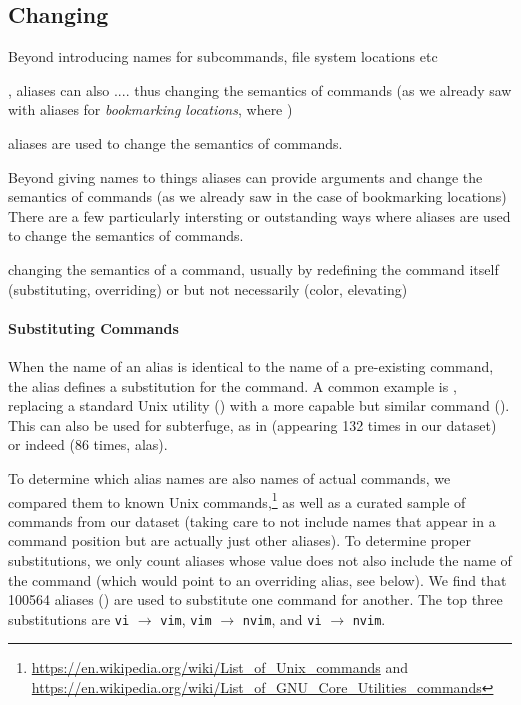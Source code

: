 \subsection{Changing}

Beyond introducing names for 
subcommands, file system locations etc

, aliases can also ....
thus changing the semantics of commands (as we already saw with aliases for \emph{bookmarking locations}, where )

aliases are used to change the semantics of commands.


Beyond giving names to things
aliases can provide arguments
and change the semantics of commands (as we already saw in the case of bookmarking locations)
There are a few particularly intersting or outstanding ways where aliases are used to change the semantics of commands.

\TODO changing the semantics of a command, usually by redefining the command itself (substituting, overriding) or but not necessarily (color, elevating)

\paragraph{\bf Substituting Commands}

When the name of an alias is identical to the name of a pre-existing command, the alias defines a substitution for the command.
A common example is , replacing a standard Unix utility () with a more capable but similar command ().
This can also be used for subterfuge, as in  (appearing 132 times in our dataset) or indeed  (86 times, alas).

To determine which alias names are also names of actual commands, we compared them to known Unix commands,\footnote{\url{https://en.wikipedia.org/wiki/List_of_Unix_commands} and \url{https://en.wikipedia.org/wiki/List_of_GNU_Core_Utilities_commands}} as well as a curated sample of commands from our dataset (taking care to not include names that appear in a command position but are actually just other aliases).
To determine proper substitutions, we only count aliases whose value does not also include the name of the command (which would point to an overriding alias, see below).
We find that \num{100564} aliases () are used to substitute one command for another.
The top three substitutions are \verb|vi| $\rightarrow$ \verb|vim|, \verb|vim| $\rightarrow$ \verb|nvim|, and \verb|vi| $\rightarrow$ \verb|nvim|.

